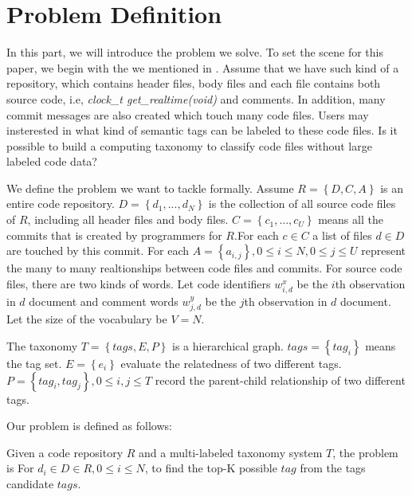 \section{Problem Definition}
\label{sec:pro}

In this part, we will introduce the problem we solve. To set the scene 
for this paper, we begin with the   we mentioned
in . Assume that we have such kind of a repository,
which contains header files, body files and each file contains both source
code, i.e, {\it clock\_t get\_realtime(void)} and comments. In addition,
many commit messages are also created which touch many code files. Users
may insterested in what kind of semantic tags can be labeled to these
code files. Is it possible to build a computing taxonomy to classify
code files without large labeled code data?

We define the problem we want to tackle formally.
Assume $R=\left\{D,C,A\right\}$ is an entire code repository.
$D=\left\{d_1,..., d_N\right\}$ is the collection of all source code files of $R$, 
including all header files and body files. 
$C=\left\{c_1,..., c_U\right\}$ means all the commits that is created by programmers
for $R$.For each $c\in C$ a list of files $d \in D$ are touched by this commit.
For each $A=\left\{a_{i,j}\right\},0 \le i \le N,0 \le j \le U$ represent the many 
to many realtionships between code files and commits. For source code files, there are
two kinds of words. Let code identifiers $w_{i,d}^x$ be the $i$th 
observation in $d$ document and comment words $w_{j,d}^y$ be the $j$th 
observation in $d$ document. Let the size of the vocabulary be $V = N$.

The taxonomy $T=\left\{tags, E, P\right\}$ is a hierarchical graph.
$tags = \left\{tag_i\right\}$ means the tag set. $E=\left\{e_i\right\}$
evaluate the relatedness of two different tags. $P=\left\{tag_i, tag_j\right\},0 \le i,j \le T$
record the parent-child relationship of two different tags. 

Our problem is defined as follows:
\begin{Problem}
\label{pro:pro}
Given a code repository $R$ and a multi-labeled taxonomy system $T$, the problem is
For $d_i\in D \in R,0 \le i \le N$, to find the top-K possible $tag$ from the tags candidate $tags$.
\end{Problem}

